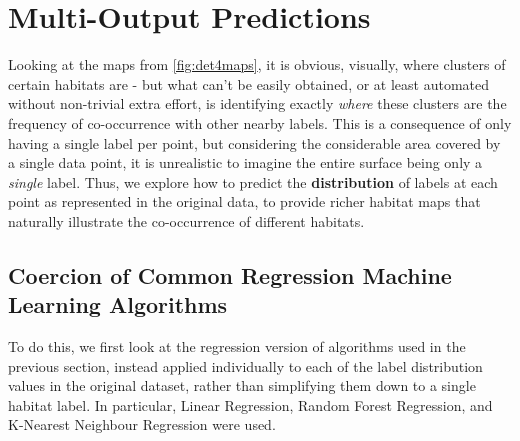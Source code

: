 


\section{Multi-Output Predictions} 
Looking at the maps from \autoref{fig:det4maps}, it is obvious, visually, where clusters of certain habitats are - but what can't be easily obtained, or at least automated without non-trivial extra effort, is identifying exactly \textit{where} these clusters are the frequency of co-occurrence with other nearby labels. This is a consequence of only having a single label per point, but considering the considerable area covered by a single data point, it is unrealistic to imagine the entire surface being only a \textit{single} label. Thus, we explore how to predict the \textbf{distribution} of labels at each point as represented in the original data, to provide richer habitat maps that naturally illustrate the co-occurrence of different habitats.

\subsection{Coercion of Common Regression Machine Learning Algorithms} \label{ss:commonMLcoercion}
To do this, we first look at the regression version of algorithms used in the previous section, instead applied individually to each of the label distribution values in the original dataset, rather than simplifying them down to a single habitat label. In particular, Linear Regression, Random Forest Regression, and K-Nearest Neighbour Regression were used. 

